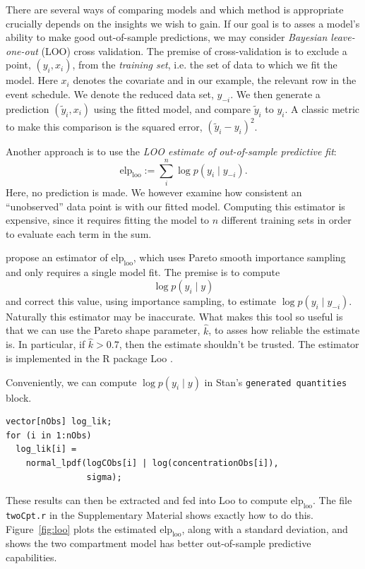There are several ways of comparing models and which method is appropriate crucially depends on the insights we wish to gain.
If our goal is to asses a model's ability to make good out-of-sample predictions, we may consider \textit{Bayesian leave-one-out} (LOO) cross validation.
The premise of cross-validation is to exclude a point, $(y_i, x_i)$, from the \textit{training set}, i.e. the set of data to which we fit the model.
Here $x_i$ denotes the covariate and in our example, the relevant row in the event schedule.
We denote the reduced data set, $y_{-i}$.
We then generate a prediction $(\tilde y_i, x_i)$ using the fitted model, and compare $\tilde y_i$ to $y_i$.
A classic metric to make this comparison is the squared error, $(\tilde y_i - y_i)^2$.

Another approach is to use the \textit{LOO estimate of out-of-sample predictive fit}:
\begin{equation*}
  \mathrm{elp}_\mathrm{loo} := \sum_{i}^n \log p(y_i \mid y_{-i}).
\end{equation*}
%
Here, no prediction is made.
We however examine how consistent an ``unobserved'' data point is with our fitted model.
Computing this estimator is expensive, since it requires fitting the model to $n$ different training sets in order to evaluate each term in the sum.

\citet{Vehtari:2016} propose an estimator of $\mathrm{elp}_\mathrm{loo}$, which uses Pareto smooth importance sampling and only requires a single model fit.
The premise is to compute
\begin{equation*}
  \log p(y_i \mid y)
\end{equation*}
and correct this value, using importance sampling, to estimate $\log p(y_i \mid y_{-i})$.
Naturally this estimator may be inaccurate.
What makes this tool so useful is that we can use the Pareto shape parameter, $\hat k$, to asses how reliable the estimate is.
In particular, if $\hat k > 0.7$, then the estimate shouldn't be trusted.
The estimator is implemented in the R package Loo \cite{Gabry:2020}.

Conveniently, we can compute $\log p(y_i \mid y)$ in Stan's \texttt{generated quantities} block.
\begin{lstlisting}
vector[nObs] log_lik;
for (i in 1:nObs)
  log_lik[i] =  
    normal_lpdf(logCObs[i] | log(concentrationObs[i]), 
                sigma);
\end{lstlisting}
These results can then be extracted and fed into Loo to compute $\mathrm{elp}_\mathrm{loo}$.
The file \texttt{twoCpt.r} in the Supplementary Material shows exactly how to do this.
Figure~\ref{fig:loo} plots the estimated $\mathrm{elp}_\mathrm{loo}$, along with a standard deviation, and shows the two compartment model has better out-of-sample predictive capabilities.

